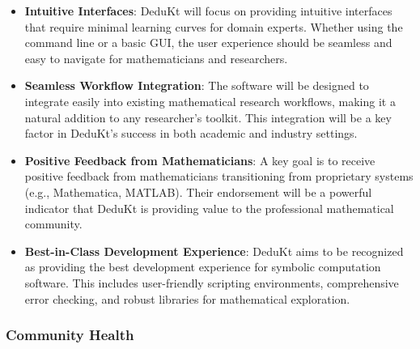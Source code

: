 \begin{itemize}
    \item \textbf{Intuitive Interfaces}: DeduKt will focus on providing intuitive interfaces that require minimal learning curves for domain experts.
    Whether using the command line or a basic GUI, the user experience should be seamless and easy to navigate for mathematicians and researchers.

    \item \textbf{Seamless Workflow Integration}: The software will be designed to integrate easily into existing mathematical research workflows, making it a natural addition to any researcher’s toolkit.
    This integration will be a key factor in DeduKt’s success in both academic and industry settings.

    \item \textbf{Positive Feedback from Mathematicians}: A key goal is to receive positive feedback from mathematicians transitioning from proprietary systems (e.g., Mathematica, MATLAB).
    Their endorsement will be a powerful indicator that DeduKt is providing value to the professional mathematical community.

    \item \textbf{Best-in-Class Development Experience}: DeduKt aims to be recognized as providing the best development experience for symbolic computation software.
    This includes user-friendly scripting environments, comprehensive error checking, and robust libraries for mathematical exploration.
\end{itemize}

\subsubsection{Community Health}

